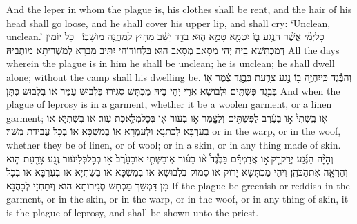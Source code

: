 {And the leper in whom the plague is, his clothes shall be rent, and the hair of his head shall go loose, and he shall cover his upper lip, and shall cry: ‘Unclean, unclean.’}{}
{כׇּל\maqqaf יְמֵ֞י אֲשֶׁ֨ר הַנֶּ֥גַע בּ֛וֹ יִטְמָ֖א טָמֵ֣א ה֑וּא בָּדָ֣ד יֵשֵׁ֔ב מִח֥וּץ לַֽמַּחֲנֶ֖ה מוֹשָׁבֽוֹ׃ \setuma }
{כָּל יוֹמִין דְּמַכְתָּשָׁא בֵיהּ יְהֵי מְסָאַב מְסָאַב הוּא בִּלְחוֹדוֹהִי יִתֵּיב מִבַּרָא לְמַשְׁרִיתָא מוֹתְבֵיהּ׃}
{All the days wherein the plague is in him he shall be unclean; he is unclean; he shall dwell alone; without the camp shall his dwelling be.}{}
{וְהַבֶּ֕גֶד כִּֽי\maqqaf יִהְיֶ֥ה ב֖וֹ נֶ֣גַע צָרָ֑עַת בְּבֶ֣גֶד צֶ֔מֶר א֖וֹ בְּבֶ֥גֶד פִּשְׁתִּֽים׃}
{וּלְבוּשָׁא אֲרֵי יְהֵי בֵיהּ מַכְתָּשׁ סְגִירוּ בִּלְבוּשׁ עַמַּר אוֹ בִלְבוּשׁ כִּתָּן׃}
{And when the plague of leprosy is in a garment, whether it be a woolen garment, or a linen garment;}{}
{א֤וֹ בִֽשְׁתִי֙ א֣וֹ בְעֵ֔רֶב לַפִּשְׁתִּ֖ים וְלַצָּ֑מֶר א֣וֹ בְע֔וֹר א֖וֹ בְּכׇל\maqqaf מְלֶ֥אכֶת עֽוֹר׃}
{אוֹ בְשִׁתְיָא אוֹ בְעִרְבָּא לְכִתָּנָא וּלְעַמְרָא אוֹ בְמַשְׁכָּא אוֹ בְכָל עֲבִידַת מְשַׁךְ׃}
{or in the warp, or in the woof, whether they be of linen, or of wool; or in a skin, or in any thing made of skin.}{}
{וְהָיָ֨ה הַנֶּ֜גַע יְרַקְרַ֣ק \legarmeh  א֣וֹ אֲדַמְדָּ֗ם בַּבֶּ֩גֶד֩ א֨וֹ בָע֜וֹר אֽוֹ\maqqaf בַשְּׁתִ֤י אוֹ\maqqaf בָעֵ֙רֶב֙ א֣וֹ בְכׇל\maqqaf כְּלִי\maqqaf ע֔וֹר נֶ֥גַע צָרַ֖עַת ה֑וּא וְהׇרְאָ֖ה אֶת\maqqaf הַכֹּהֵֽן׃}
{וִיהֵי מַכְתָּשָׁא יָרוֹק אוֹ סָמוֹק בִּלְבוּשָׁא אוֹ בְמַשְׁכָּא אוֹ בְשִׁתְיָא אוֹ בְעִרְבָּא אוֹ בְכָל מָן דִּמְשַׁךְ מַכְתָּשׁ סְגִירוּתָא הוּא וְיִתַּחְזֵי לְכָהֲנָא׃}
{If the plague be greenish or reddish in the garment, or in the skin, or in the warp, or in the woof, or in any thing of skin, it is the plague of leprosy, and shall be shown unto the priest.}{}
